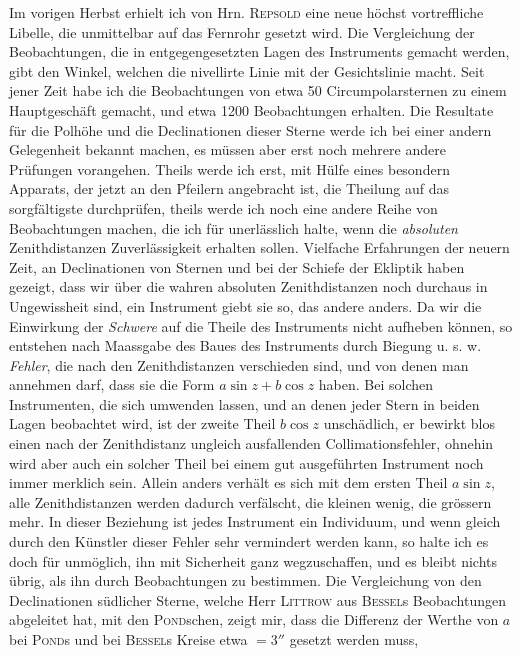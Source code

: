 \par\indent Im vorigen Herbst erhielt ich von Hrn. \textsc{Repsold} eine neue höchst vortreffliche Libelle, die unmittelbar auf das Fernrohr gesetzt wird. Die Vergleichung der Beobachtungen, die in entgegengesetzten Lagen des Instruments gemacht werden, gibt den Winkel, welchen die nivellirte Linie mit der Gesichtslinie macht. Seit jener Zeit habe ich die Beobachtungen von etwa 50 Circumpolarsternen zu einem Hauptgeschäft gemacht, und etwa 1200 Beobachtungen erhalten. Die Resultate für die Polhöhe
und die Declinationen dieser Sterne werde ich bei einer andern Gelegenheit bekannt machen, es müssen aber erst noch mehrere andere Prüfungen vorangehen. Theils werde ich erst, mit Hülfe eines besondern Apparats, der jetzt an den Pfeilern angebracht ist, die Theilung auf das sorgfältigste durchprüfen, theils werde ich noch eine andere Reihe von Beobachtungen machen, die ich für unerlässlich
halte, wenn die \emph{absoluten} Zenithdistanzen Zuverlässigkeit erhalten sollen. Vielfache Erfahrungen der
neuern Zeit, an Declinationen von Sternen und bei der Schiefe der Ekliptik haben gezeigt, dass wir 
über die wahren absoluten Zenithdistanzen noch durchaus in Ungewissheit sind, ein Instrument giebt
sie so, das andere anders. Da wir die Einwirkung der \emph{Schwere} auf die Theile des Instruments
nicht aufheben können, so entstehen nach Maassgabe des Baues des Instruments durch Biegung u. s. w.
\emph{Fehler}, die nach den Zenithdistanzen verschieden sind, und von denen man annehmen darf, dass
sie die Form $a\sin z+b\cos z$ haben. Bei solchen Instrumenten, die sich umwenden lassen, und an denen
jeder Stern in beiden Lagen beobachtet wird, ist der zweite Theil $b\cos z$ unschädlich, er bewirkt
blos einen nach der Zenithdistanz ungleich ausfallenden Collimationsfehler, ohnehin wird aber auch ein
solcher Theil bei einem gut ausgeführten Instrument noch immer merklich sein. Allein anders verhält
es sich mit dem ersten Theil $a\sin z$, alle Zenithdistanzen werden dadurch verfälscht, die kleinen
wenig, die grössern mehr. In dieser Beziehung ist jedes Instrument ein Individuum, und wenn gleich
durch den Künstler dieser Fehler sehr vermindert werden kann, so halte ich es doch für unmöglich,
ihn mit Sicherheit ganz wegzuschaffen, und es bleibt nichts übrig, als ihn durch Beobachtungen zu
bestimmen. Die Vergleichung von den Declinationen südlicher Sterne, welche Herr \textsc{Littrow} aus
\textsc{Bessel}s Beobachtungen abgeleitet hat, mit den \textsc{Pond}schen, zeigt mir, dass die Differenz
der Werthe von $a$ bei \textsc{Pond}s und bei \textsc{Bessel}s Kreise etwa $=3''$ gesetzt werden muss,
